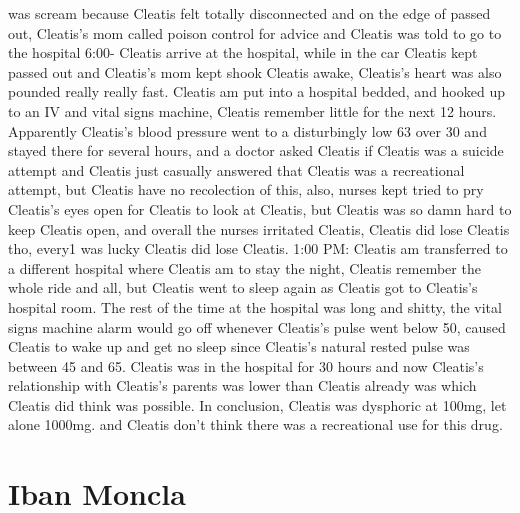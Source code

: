 \documentclass[12pt]{book}
\begin{document}
was scream because Cleatis felt totally disconnected and on the edge of passed out, Cleatis's mom called poison control for advice and Cleatis was told to go to the hospital 6:00- Cleatis arrive at the hospital, while in the car Cleatis kept passed out and Cleatis's mom kept shook Cleatis awake, Cleatis's heart was also pounded really really fast. Cleatis am put into a hospital bedded, and hooked up to an IV and vital signs machine, Cleatis remember little for the next 12 hours. Apparently Cleatis's blood pressure went to a disturbingly low 63 over 30 and stayed there for several hours, and a doctor asked Cleatis if Cleatis was a suicide attempt and Cleatis just casually answered that Cleatis was a recreational attempt, but Cleatis have no recolection of this, also, nurses kept tried to pry Cleatis's eyes open for Cleatis to look at Cleatis, but Cleatis was so damn hard to keep Cleatis open, and overall the nurses irritated Cleatis, Cleatis did lose Cleatis tho, every1 was lucky Cleatis did lose Cleatis. 1:00 PM: Cleatis am transferred to a different hospital where Cleatis am to stay the night, Cleatis remember the whole ride and all, but Cleatis went to sleep again as Cleatis got to Cleatis's hospital room. The rest of the time at the hospital was long and shitty, the vital signs machine alarm would go off whenever Cleatis's pulse went below 50, caused Cleatis to wake up and get no sleep since Cleatis's natural rested pulse was between 45 and 65. Cleatis was in the hospital for 30 hours and now Cleatis's relationship with Cleatis's parents was lower than Cleatis already was which Cleatis did think was possible. In conclusion, Cleatis was dysphoric at 100mg, let alone 1000mg. and Cleatis don't think there was a recreational use for this drug.



\chapter{Iban Moncla}
\end{document}
